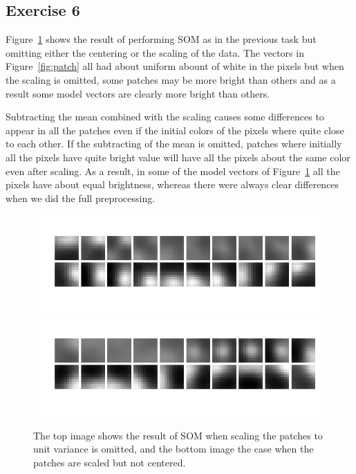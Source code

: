 \documentclass{article}
\begin{document}
\subsection{Exercise 6}
Figure~\ref{fig:nopp} shows the result of performing SOM as in the previous task but omitting either the centering or the scaling of the data.
The vectors in Figure~\ref{fig:patch} all had about uniform abount of white in the pixels but when the scaling is omitted, some patches may be more bright than others and as a result some model vectors are clearly more bright than others.

Subtracting the mean combined with the scaling causes some differences to appear in all the patches even if the initial colors of the pixels where quite close to each other.
If the subtracting of the mean is omitted, patches where initially all the pixels have quite bright value will have all the pixels about the same color even after scaling.
As a result, in some of the model vectors of Figure~\ref{fig:nopp} all the pixels have about equal brightness, whereas there were always clear differences when we did the full preprocessing.

\begin{figure}
	\includegraphics[width=\columnwidth]{noscale}
	\includegraphics[width=\columnwidth]{nocenter}
	\caption{The top image shows the result of SOM when scaling the patches to unit variance is omitted, and the bottom image the case when the patches are scaled but not centered.}\label{fig:nopp}
\end{figure}
\end{document}
